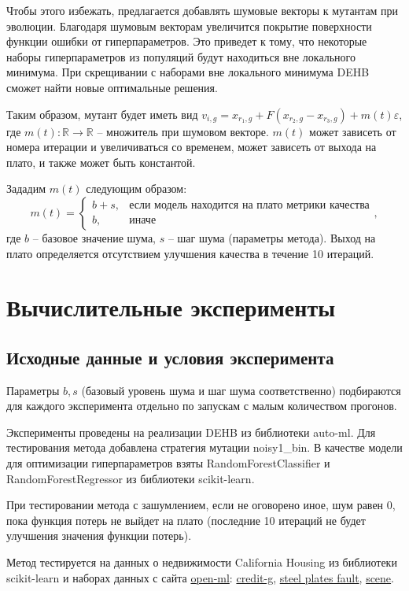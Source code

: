 \documentclass{article}
\begin{document}
Чтобы этого избежать, предлагается добавлять шумовые векторы к мутантам при эволюции. Благодаря шумовым векторам увеличится покрытие поверхности функции ошибки от гиперпараметров. Это приведет к тому, что некоторые наборы гиперпараметров из популяций будут находиться вне локального минимума. При скрещивании с наборами вне локального минимума DEHB сможет найти новые оптимальные решения.

Таким образом, мутант будет иметь вид $v_{i, g} = x_{r_1, g} + F(x_{r_2, g} - x_{r_3, g}) + m(t)\varepsilon$, где $m(t): \mathbb{R} \to \mathbb{R}$ -- множитель при шумовом векторе. $m(t)$ может зависеть от номера итерации и увеличиваться со временем, может зависеть от выхода на плато, и также может быть константой.

Зададим $m(t)$ следующим образом: 
$$
m(t) = \begin{cases}
			b + s, & \text{если модель находится на плато метрики качества}\\
            b, & \text{иначе}
		 \end{cases},$$ 
где $b$ -- базовое значение шума, $s$ -- шаг шума (параметры метода). Выход на плато определяется отсутствием улучшения качества в течение 10 итераций.

\newpage

\section{Вычислительные эксперименты}

\subsection{Исходные данные и условия эксперимента}
Параметры $b, s$ (базовый уровень шума и шаг шума соответственно) подбираются для каждого эксперимента отдельно по запускам с малым количеством прогонов.

Эксперименты проведены на реализации DEHB из библиотеки auto-ml. Для тестирования метода добавлена стратегия мутации noisy1\_bin. В качестве модели для оптимизации гиперпараметров взяты RandomForestClassifier и RandomForestRegressor из библиотеки scikit-learn. 

При тестировании метода с зашумлением, если не оговорено иное, шум равен 0, пока функция потерь не выйдет на плато (последние 10 итераций не будет улучшения значения функции потерь).

Метод тестируется на  данных о недвижимости California Housing из библиотеки scikit-learn и наборах данных с сайта \href{https://www.openml.org/}{open-ml}: \href{https://www.openml.org/search?type=data&sort=runs&status=active&id=31}{credit-g}, \href{https://www.openml.org/search?type=data&status=active&id=1504&sort=runs}{steel plates fault}, \href{https://www.openml.org/search?type=data&status=active&id=312}{scene}.
\end{document}

